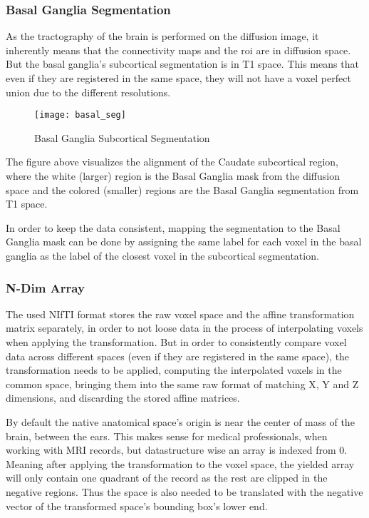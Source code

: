\subsubsection{Basal Ganglia Segmentation}

As the tractography of the brain is performed on the diffusion image, it inherently means that the connectivity maps and the roi are in diffusion space. But the basal ganglia's subcortical segmentation is in T1 space. This means that even if they are registered in the same space, they will not have a voxel perfect union due to the different resolutions.

\begin{figure}[H]
\centering
\texttt{[image: basal\_seg]}
\caption{Basal Ganglia Subcortical Segmentation}
\label{fig:basal_seg}
\end{figure}

The figure above visualizes the alignment of the Caudate subcortical region, where the white (larger) region is the Basal Ganglia mask from the diffusion space and the colored (smaller) regions are the Basal Ganglia segmentation from T1 space.\par

In order to keep the data consistent, mapping the segmentation to the Basal Ganglia mask can be done by assigning the same label for each voxel in the basal ganglia as the label of the closest voxel in the subcortical segmentation.

\subsubsection{N-Dim Array}
The used \ac{NIfTI} format stores the raw voxel space and the affine transformation matrix separately, in order to not loose data in the process of interpolating voxels when applying the transformation. But in order to consistently compare voxel data across different spaces (even if they are registered in the same space), the transformation needs to be applied, computing the interpolated voxels in the common space, bringing them into the same raw format of matching X, Y and Z dimensions, and discarding the stored affine matrices.\par

By default the native anatomical space's origin is near the center of mass of the brain, between the ears. This makes sense for medical professionals, when working with \ac{MRI} records, but datastructure wise an array is indexed from 0. Meaning after applying the transformation to the voxel space, the yielded array will only contain one quadrant of the record as the rest are clipped in the negative regions. Thus the space is also needed to be translated with the negative vector of the transformed space's bounding box's lower end.\par

